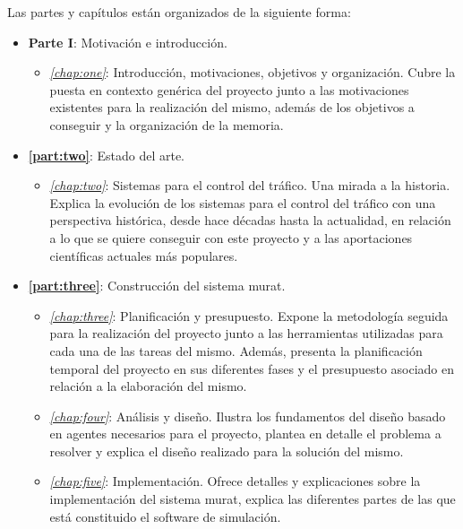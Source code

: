 Las partes y capítulos están organizados de la siguiente forma:
\begin{itemize}
    \item \textbf{Parte I}: Motivación e introducción. 
    \begin{itemize}
        \item \textit{\autoref{chap:one}}: Introducción, motivaciones, objetivos y organización. Cubre la puesta en contexto genérica del proyecto junto a las motivaciones existentes para la realización del mismo, además de los objetivos a conseguir y la organización de la memoria. 
    \end{itemize}

    \item \textbf{\autoref{part:two}}: Estado del arte.
    \begin{itemize}
        \item \textit{\autoref{chap:two}}: Sistemas para el control del tráfico. Una mirada a la historia. Explica la evolución de los sistemas para el control del tráfico con una perspectiva histórica, desde hace décadas hasta la actualidad, en relación a lo que se quiere conseguir con este proyecto y a las aportaciones científicas actuales más populares.
    \end{itemize}

    \item \textbf{\autoref{part:three}}: Construcción del sistema \acrshort{murat}.
    \begin{itemize}
        \item \textit{\autoref{chap:three}}: Planificación y presupuesto. Expone la metodología seguida para la realización del proyecto junto a las herramientas utilizadas para cada una de las tareas del mismo. Además, presenta la planificación temporal del proyecto en sus diferentes fases y el presupuesto asociado en relación a la elaboración del mismo.
        \item \textit{\autoref{chap:four}}: Análisis y diseño. Ilustra los fundamentos del diseño basado en agentes necesarios para el proyecto, plantea en detalle el problema a resolver y explica el diseño realizado para la solución del mismo.  
        \item \textit{\autoref{chap:five}}: Implementación. Ofrece detalles y explicaciones sobre la implementación del sistema \acrshort{murat}, explica las diferentes partes de las que está constituido el software de simulación.
    \end{itemize}


\end{itemize}
